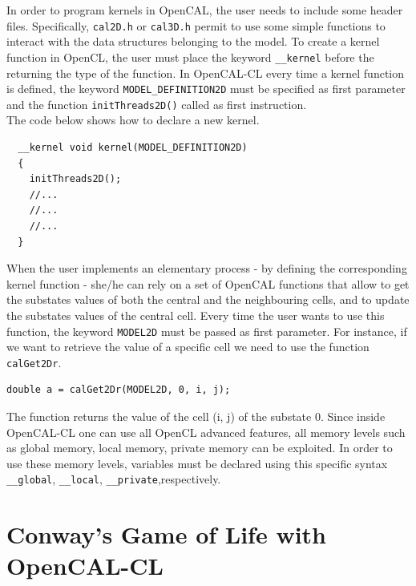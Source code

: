 In order to program kernels in OpenCAL, the user needs to include some
header files. Specifically, \verb'cal2D.h' or \verb'cal3D.h' permit
to use some simple functions to interact with the data structures
belonging to the model. To create a kernel function in OpenCL, the user
must place the keyword \verb'__kernel' before the returning the type
of the function. In OpenCAL-CL every time a kernel function is defined, the
keyword \verb'MODEL_DEFINITION2D' must be specified as first parameter
and the function \verb'initThreads2D()' called as first
instruction.\\ The code below shows how to declare a new kernel.

\begin{lstlisting} 
  __kernel void kernel(MODEL_DEFINITION2D)
  {
    initThreads2D();
    //...
    //...
    //...
  }
\end{lstlisting}

When the user implements an elementary process - by defining
the corresponding kernel function - she/he can rely on a set of OpenCAL functions
that allow to get the substates values of both the central and the
neighbouring cells, and to update the substates values of the central
cell. Every time the user wants to use this function, the keyword \verb'MODEL2D' must be passed
as first parameter. For instance, if we
want to retrieve the value of a specific cell we need to use the function
\verb'calGet2Dr'.

\begin{lstlisting}[numbers=none] 
	double a = calGet2Dr(MODEL2D, 0, i, j);
\end{lstlisting}

The function returns the value of the cell (i, j) of the substate
0. Since inside OpenCAL-CL one can use all OpenCL advanced features, all
memory levels such as global memory, local memory, private memory
can be exploited. In order to use these memory
levels, variables must be declared using this specific syntax
\verb'__global', \verb'__local', \verb'__private',respectively.

\section{Conway's Game of Life with OpenCAL-CL}
 
